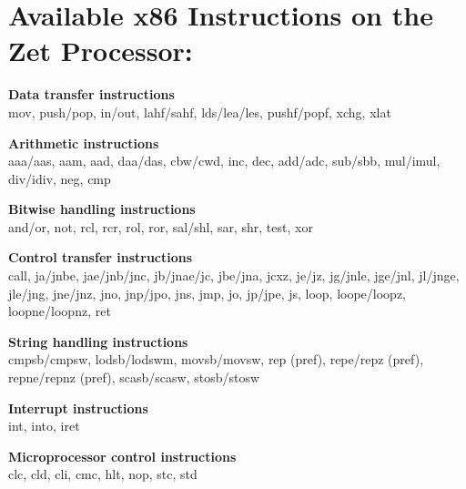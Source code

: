 \documentclass[11pt,peerreview, onecolumn]{IEEEtran}
\begin{document}
\label{App:AppendixB}
\section{Available x86 Instructions on the Zet Processor:}

{\noindent\bf Data transfer instructions} \\
mov, push/pop, in/out, lahf/sahf, lds/lea/les, pushf/popf, xchg, xlat

{\noindent\bf Arithmetic instructions} \\
aaa/aas, aam, aad, daa/das, cbw/cwd, inc, dec, add/adc, sub/sbb, mul/imul, div/idiv, neg, cmp

{\noindent\bf Bitwise handling instructions} \\
and/or, not, rcl, rcr, rol, ror, sal/shl, sar, shr, test, xor

{\noindent\bf Control transfer instructions} \\
call, ja/jnbe, jae/jnb/jnc, jb/jnae/jc, jbe/jna, jcxz, je/jz, jg/jnle, jge/jnl, jl/jnge, jle/jng, jne/jnz, jno, jnp/jpo, jns, jmp, jo, jp/jpe, js, loop, loope/loopz, loopne/loopnz, ret

{\noindent\bf String handling instructions}\\
cmpsb/cmpsw, lodsb/lodswm, movsb/movsw, rep (pref), repe/repz (pref), repne/repnz (pref), scasb/scasw, stosb/stosw

{\noindent\bf Interrupt instructions} \\
int, into, iret

{\noindent\bf Microprocessor control instructions} \\
clc, cld, cli, cmc, hlt, nop, stc, std



\end{document}
